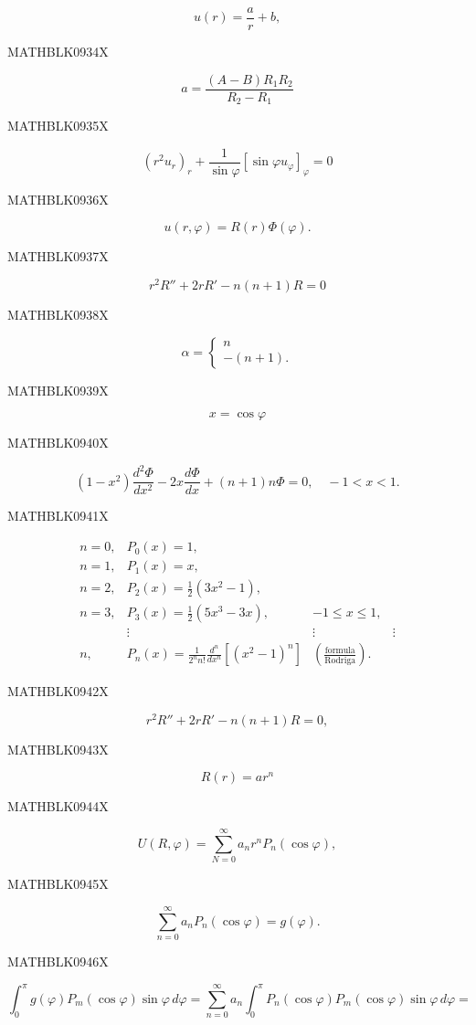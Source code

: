 \documentclass[
  ukrainian,
]{article}
\begin{document}
\[
u(r) = \frac{a}{r} + b,
\]

MATHBLK0934X

\[
a = \frac{(A-B)R_1R_2}{R_2-R_1}
\]

MATHBLK0935X

\[
(r^2u_r)_r + \frac{1}{\sin\varphi} [\sin\varphi u_\varphi]_\varphi = 0
\]

MATHBLK0936X

\[
u(r, \varphi) = R(r) \Phi(\varphi).
\]

MATHBLK0937X

\[
r^2R'' + 2rR' - n(n+1)R = 0
\]

MATHBLK0938X

\[
\alpha = \begin{cases} n \\ -(n+1). \end{cases}
\]

MATHBLK0939X

\[
x = \cos \varphi
\]

MATHBLK0940X

\[
(1-x^2)\frac{d^2\Phi}{dx^2} - 2x\frac{d\Phi}{dx} + (n+1)n\Phi = 0, \quad -1 < x < 1.
\]

MATHBLK0941X

\[
\begin{array}{llll} n=0, & P_{0}(x)=1, \\ n=1, & P_{1}(x)=x, \\ n=2, & P_{2}(x)=\frac{1}{2}(3x^{2}-1), \\ n=3, & P_{3}(x)=\frac{1}{2}(5x^{3}-3x), & -1\leqslant x\leqslant 1, \\ & \vdots & \vdots & \vdots \\ n, & P_{n}(x)=\frac{1}{2^{n}n!}\frac{d^{n}}{dx^{n}}[(x^{2}-1)^{n}] & \left(\frac{\text{formula}}{\text{Rodriga}}\right). \end{array}
\]

MATHBLK0942X

\[
r^2R'' + 2rR' - n(n+1)R = 0,
\]

MATHBLK0943X

\[
R(r) = ar^n
\]

MATHBLK0944X

\[
U(R, \varphi) = \sum_{N=0}^{\infty} a_n r^n P_n(\cos \varphi),
\]

MATHBLK0945X

\[
\sum_{n=0}^{\infty} a_n P_n (\cos \varphi) = g(\varphi).
\]

MATHBLK0946X

\[
\int_{0}^{\pi} g(\varphi) P_{m}(\cos \varphi) \sin \varphi \, d\varphi = \sum_{n=0}^{\infty} a_{n} \int_{0}^{\pi} P_{n}(\cos \varphi) P_{m}(\cos \varphi) \sin \varphi \, d\varphi =
\]
\end{document}
